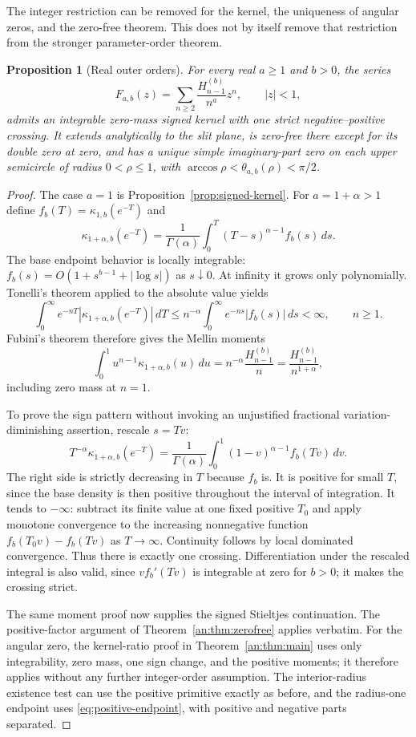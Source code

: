 \documentclass[11pt]{article}
\numberwithin{equation}{section}
\theoremstyle{plain}
\newtheorem{proposition}[theorem]{Proposition}
\theoremstyle{definition}
\theoremstyle{remark}
\begin{document}
The integer restriction can be removed for the kernel, the uniqueness
of angular zeros, and the zero-free theorem. This does not by itself
remove that restriction from the stronger parameter-order theorem.

\begin{proposition}[Real outer orders]\label{an:prop:realorder}
For every real $a\ge1$ and $b>0$, the series
\[
 F_{a,b}(z)=\sum_{n\ge2}\frac{H_{n-1}^{(b)}}{n^a}z^n,
 \qquad |z|<1,
\]
admits an integrable zero-mass signed kernel with one strict
negative--positive crossing. It extends analytically to the slit
plane, is zero-free there except for its double zero at zero, and
has a unique simple imaginary-part zero on each upper semicircle
of radius $0<\rho\le1$, with $\arccos\rho<\theta_{a,b}(\rho)<\pi/2$.
\end{proposition}
\begin{proof}
The case $a=1$ is Proposition~\ref{prop:signed-kernel}. For $a=1+\alpha>1$ define
$f_b(T)=\kappa_{1,b}(e^{-T})$ and
\[
 \kappa_{1+\alpha,b}(e^{-T})
 =\frac1{\Gamma(\alpha)}\int_0^T
       (T-s)^{\alpha-1}f_b(s)\,ds.
\]
The base endpoint behavior is locally integrable:
$f_b(s)=O(1+s^{b-1}+|\log s|)$ as $s\downarrow0$.
At infinity it grows only polynomially. Tonelli's theorem applied
to the absolute value yields
\[
 \int_0^\infty e^{-nT}
       |\kappa_{1+\alpha,b}(e^{-T})|\,dT
 \le n^{-\alpha}\int_0^\infty e^{-ns}|f_b(s)|\,ds<\infty,
 \qquad n\ge1.
\]
Fubini's theorem therefore gives the Mellin moments
\[
 \int_0^1u^{n-1}\kappa_{1+\alpha,b}(u)\,du
 =n^{-\alpha}\frac{H_{n-1}^{(b)}}n
 =\frac{H_{n-1}^{(b)}}{n^{1+\alpha}},
\]
including zero mass at $n=1$.

To prove the sign pattern without invoking an unjustified fractional
variation-diminishing assertion, rescale $s=Tv$:
\[
 T^{-\alpha}\kappa_{1+\alpha,b}(e^{-T})
 =\frac1{\Gamma(\alpha)}\int_0^1
       (1-v)^{\alpha-1}f_b(Tv)\,dv.
\]
The right side is strictly decreasing in $T$ because $f_b$ is.
It is positive for small $T$, since the base density is then
positive throughout the interval of integration. It tends to
$-\infty$: subtract its finite value at one fixed positive $T_0$
and apply monotone convergence to the increasing nonnegative
function $f_b(T_0v)-f_b(Tv)$ as $T\to\infty$.
Continuity follows by local dominated convergence. Thus there is
exactly one crossing. Differentiation under the rescaled integral
is also valid, since $v f_b'(Tv)$ is integrable at zero for $b>0$;
it makes the crossing strict.

The same moment proof now supplies the signed Stieltjes continuation.
The positive-factor argument of Theorem~\ref{an:thm:zerofree}
applies verbatim. For the angular zero, the kernel-ratio proof in Theorem~\ref{an:thm:main} uses
only integrability, zero mass, one sign change, and the positive
moments; it therefore applies without any further integer-order
assumption. The interior-radius existence test can use the positive
primitive exactly as before, and the radius-one endpoint uses \eqref{eq:positive-endpoint}, with positive and negative parts separated.
\end{proof}
\end{document}
